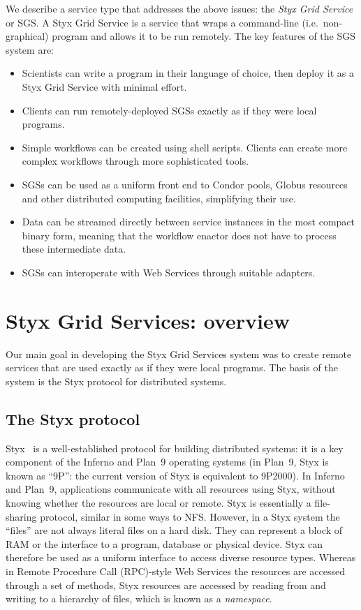 \documentclass[a4paper]{article}
\begin{document}
We describe a service type that addresses the above issues: the \textit{Styx Grid Service} or SGS.  A Styx Grid Service is a service that wraps a command-line (i.e.\ non-graphical) program and allows it to be run remotely.  The key features of the SGS system are:

\begin{itemize}
\item Scientists can write a program in their language of choice, then deploy it as a Styx Grid Service with minimal effort.
\item Clients can run remotely-deployed SGSs exactly as if they were local programs.
\item Simple workflows can be created using shell scripts.  Clients can create more complex workflows through more sophisticated tools.
\item SGSs can be used as a uniform front end to Condor pools, Globus resources and other distributed computing facilities, simplifying their use.
\item Data can be streamed directly between service instances in the most compact binary form, meaning that the workflow enactor does not have to process these intermediate data.
\item SGSs can interoperate with Web Services through suitable adapters.
\end{itemize}

\section{Styx Grid Services: overview}\label{sec:sgsoverview}
Our main goal in developing the Styx Grid Services system was to create remote services that are used exactly as if they were local programs.  The basis of the system is the Styx protocol for distributed systems.  

\subsection{The Styx protocol}
Styx~\cite{Pike:1999} is a well-established protocol for building distributed systems: it is a key component of the Inferno \cite{Inferno} and Plan~9 \cite{Plan9} operating systems (in Plan~9, Styx is known as ``9P'': the current version of Styx is equivalent to 9P2000).  In Inferno and Plan~9, applications communicate with all resources using Styx, without knowing whether the resources are local or remote.  Styx is essentially a file-sharing protocol, similar in some ways to NFS.  However, in a Styx system the ``files'' are not always literal files on a hard disk.  They can represent a block of RAM or the interface to a program, database or physical device.  Styx can therefore be used as a uniform interface to access diverse resource types.  Whereas in Remote Procedure Call (RPC)-style Web Services the resources are accessed through a set of methods, Styx resources are accessed by reading from and writing to a hierarchy of files, which is known as a \textit{namespace\/}.
\end{document}
